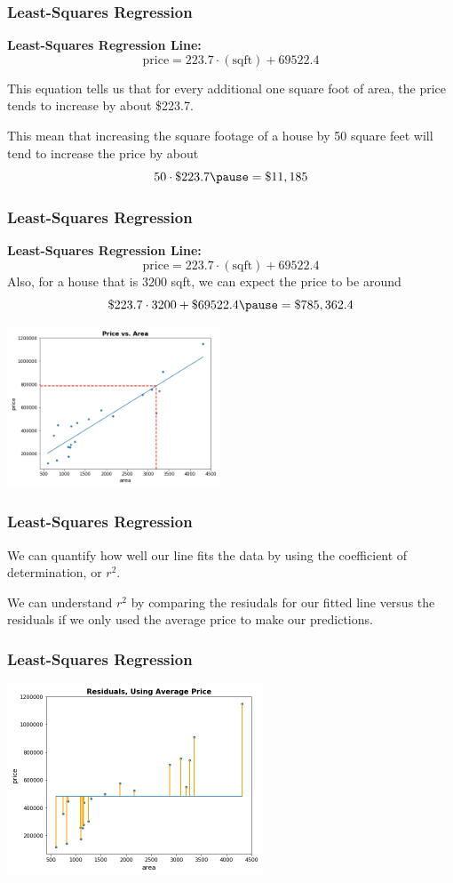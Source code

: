 \documentclass[11pt, table]{beamer}
\newcommand{\p}{\pause}
\begin{document}
\begin{frame}
\frametitle{Least-Squares Regression}
\textbf{Least-Squares Regression Line:}
$$\text{price} = 223.7\cdot(\text{sqft}) + 69522.4$$

This equation tells us that for every additional one square foot of area, the price tends to increase by about \$223.7. \p
\vspace{0.1in}

This mean that increasing the square footage of a house by 50 square feet will tend to increase the price by about\p
 $$50\cdot\$223.7\p = \$11,185$$
\end{frame}

\begin{frame}
\frametitle{Least-Squares Regression}
\textbf{Least-Squares Regression Line:}
$$\text{price} = 223.7\cdot(\text{sqft}) + 69522.4$$
Also, for a house that is 3200 sqft, we can expect the price to be around\p
$$ \$223.7\cdot 3200 + \$69522.4 \p = \$785,362.4$$\p

\begin{center}
	\includegraphics[width=2.5in]{images/Appraisal_Values/pred_01.png}
\end{center}

\end{frame}

\begin{frame}
\frametitle{Least-Squares Regression}
We can quantify how well our line fits the data by using the coefficient of determination, or $r^2$.
\vspace{0.1in}

We can understand $r^2$ by comparing the resiudals for our fitted line versus the residuals if we only used the average price to make our predictions.
\end{frame}

\begin{frame}
\frametitle{Least-Squares Regression}

\begin{center}
	\includegraphics[width=3in]{images/Appraisal_Values/r2_01.png}
\end{center}

\end{frame}
\end{document}
